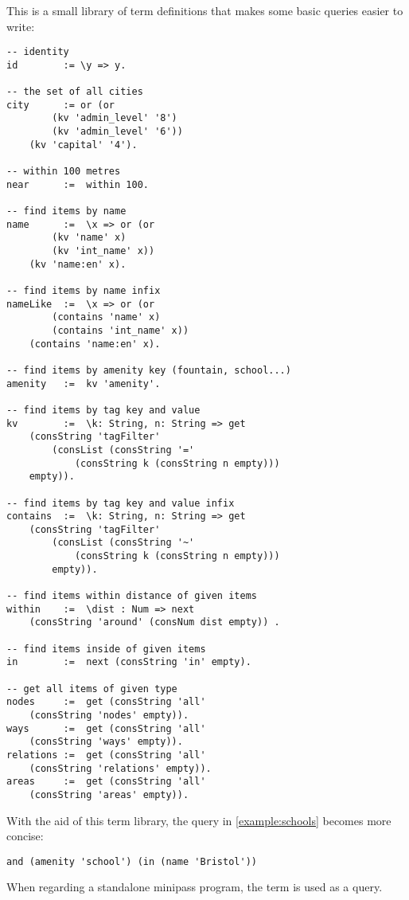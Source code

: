 \documentclass[main.tex]{subfiles}
\begin{document}
This is a small library of term definitions that makes some basic queries
easier to write:
\begin{lstlisting}
-- identity
id        := \y => y.

-- the set of all cities
city      := or (or
        (kv 'admin_level' '8')
        (kv 'admin_level' '6'))
    (kv 'capital' '4').

-- within 100 metres
near      :=  within 100.

-- find items by name
name      :=  \x => or (or
        (kv 'name' x)
        (kv 'int_name' x))
    (kv 'name:en' x).

-- find items by name infix
nameLike  :=  \x => or (or
        (contains 'name' x)
        (contains 'int_name' x))
    (contains 'name:en' x).

-- find items by amenity key (fountain, school...)
amenity   :=  kv 'amenity'.

-- find items by tag key and value
kv        :=  \k: String, n: String => get
    (consString 'tagFilter'
        (consList (consString '='
            (consString k (consString n empty)))
    empty)).

-- find items by tag key and value infix
contains  :=  \k: String, n: String => get
    (consString 'tagFilter'
        (consList (consString '~'
            (consString k (consString n empty)))
        empty)).

-- find items within distance of given items
within    :=  \dist : Num => next
    (consString 'around' (consNum dist empty)) .

-- find items inside of given items
in        :=  next (consString 'in' empty).

-- get all items of given type
nodes     :=  get (consString 'all'
    (consString 'nodes' empty)).
ways      :=  get (consString 'all'
    (consString 'ways' empty)).
relations :=  get (consString 'all'
    (consString 'relations' empty)).
areas     :=  get (consString 'all'
    (consString 'areas' empty)).
\end{lstlisting}

\begin{exampleenv}
    With the aid of this term library, the query in \cref{example:schools}
    becomes more concise:

    \begin{lstlisting}
and (amenity 'school') (in (name 'Bristol'))
    \end{lstlisting}
\end{exampleenv}

When regarding a standalone minipass program, the term  is used
as a query.
\end{document}
